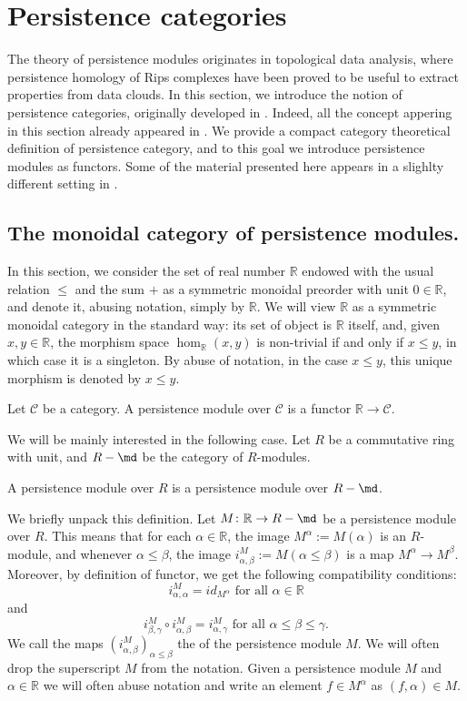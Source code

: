 
\section{Persistence categories}\label{se:PCs}
The theory of persistence modules originates in topological data analysis, where persistence homology of Rips complexes have been proved to be useful to extract properties from data clouds. In this section, we introduce the notion of persistence categories, originally developed in \cite{BCZ:tpc}. Indeed, all the concept appering in this section already appeared in \cite{BCZ:tpc}.  We provide a compact category theoretical definition of persistence category, and to this goal we introduce persistence modules as functors. Some of the material presented here appears in a slighlty different setting in \cite{bubenik2021}.

\subsection{The monoidal category of persistence modules.}\label{se:catpm}
In this section, we consider the set of real number $\mathbb{R}$ endowed with the usual relation $\leq$ and the sum $+$ as a symmetric monoidal preorder with unit $0\in \mathbb{R}$, and denote it, abusing notation, simply by $\mathbb{R}$. We will view $\mathbb{R}$ as a symmetric monoidal category in the standard way: its set of object is $\mathbb{R}$ itself, and, given $x,y\in \mathbb{R}$, the morphism space $\hom_\mathbb{R}(x,y)$ is non-trivial if and only if $x\leq y$, in which case it is a singleton. By abuse of notation, in the case $x\leq y$, this unique morphism is denoted by $x\leq y$.
\begin{dfn}
    Let $\mathcal{C}$ be a category. A persistence module over $\mathcal{C}$ is a functor $\mathbb{R}\to \mathcal{C}$.
\end{dfn}
We will be mainly interested in the following case. Let $R$ be a commutative ring with unit, and $R-\md$ be the category of $R$-modules. 
\begin{dfn}
    A persistence module over $R$ is a persistence module over $R-\md$.
\end{dfn}
We briefly unpack this definition. Let $M\colon \mathbb{R}\to R-\md$ be a persistence module over $R$. This means that for each $\alpha\in \mathbb{R}$, the image $M^\alpha:=M(\alpha)$ is an $R$-module, and whenever $\alpha\leq \beta$, the image $i^M_{\alpha,\beta}:=M(\alpha\leq \beta)$ is a map $M^\alpha\to M^\beta$. Moreover, by definition of functor, we get the following compatibility conditions:
$$i^M_{\alpha,\alpha}=id_{M^\alpha}\text{  for all  }\alpha \in \mathbb{R}$$ and $$ i^M_{\beta,\gamma}\circ i^M_{\alpha,\beta}=i^M_{\alpha,\gamma}\text{   for all }\alpha\leq\beta\leq \gamma.$$
We call the maps $(i^M_{\alpha,\beta})_{\alpha\leq \beta}$ the  of the persistence module $M$. We will often drop the superscript $M$ from the notation.
Given a persistence module $M$ and $\alpha\in \mathbb{R}$ we will often abuse notation and write an element $f\in M^\alpha$ as $(f,\alpha)\in M$.

